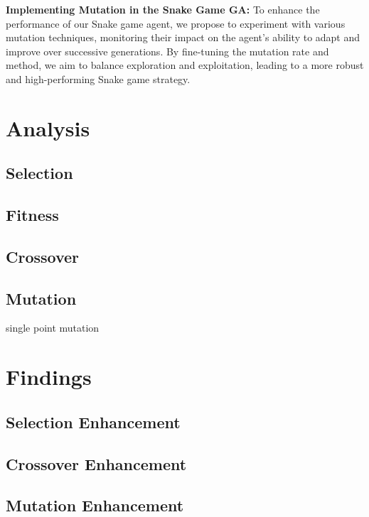 \documentclass[a4paper, twocolumn]{article}
\begin{document}
\textbf{Implementing Mutation in the Snake Game GA:} To enhance the performance of our Snake game agent, we propose to experiment with various mutation techniques, monitoring their impact on the agent's ability to adapt and improve over successive generations. By fine-tuning the mutation rate and method, we aim to balance exploration and exploitation, leading to a more robust and high-performing Snake game strategy.




\section{Analysis\label{sec:Analysis}}
\subsection{Selection\label{sec:Selection}}
\subsection{Fitness\label{sec:Fitness}}
\subsection{Crossover\label{sec:Crossover}}
\subsection{Mutation\label{sec:Mutation}}
single point mutation

\section{Findings\label{sec:Findings}}
\subsection{Selection Enhancement\label{sec:Selection Enhancement}}
\subsection{Crossover Enhancement\label{sec:Crossover Enhancement}}
\subsection{Mutation Enhancement\label{sec:Mutation Enhancement}}
\printbibliography
\end{document}
